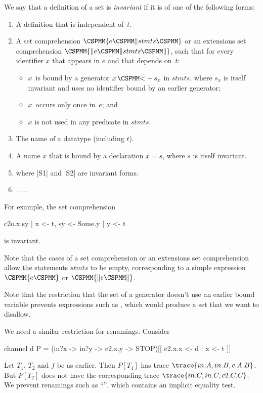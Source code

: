 \begin{definition}
\label{def:invariant}
We say that a definition of a set is \emph{invariant} if it is of one of the
following forms:
%
\begin{enumerate}
\item A definition that is independent of~$t$.

\item A set comprehension $\M\{ e \M\| stmts \M\}$ or an extensions set
comprehension $\M{\{\|} e \M\| stmts \M{\|\}}$, such that for every identifier
$x$ that appears in $e$ and that depends on~$t$:
  \begin{itemize}
  \item $x$~is bound by a generator $x \,\M{<-}\, s_x$ in $stmts$, where $s_x$ is
  itself invariant and uses no identifier bound by an earlier generator;
  \item $x$~occurs only once in~$e$; and
  \item $x$ is not used in any predicate in $stmts$.
  \end{itemize}

\item The name of a datatype (including $t$). 

\item A name $x$ that is bound by a declaration $x = s$, where $s$ is itself
invariant. 

\item {} where |S1| and |S2| are invariant forms. 

\item ......
\end{enumerate}
\end{definition}

For example, the set comprehension 
\begin{cspm}
{ c2o.x.sy | x <- t, sy <- {Some.y | y <- t} }
\end{cspm}
is invariant.

Note that the cases of a set comprehension or an extensions set comprehension
allow the statements $stmts$ to be empty, corresponding to a simple expression
$\M\{ e \M\}$ or $\M{\{\|} e \M{\|\}}$.

Note that the restriction that the set of a generator doesn't use an earlier
bound variable prevents expressions such as 
, which would produce a set that we
want to disallow.

We need a similar restriction for renamings.  Consider
%
\begin{cspm}
channel d
P = (in?x -> in?y -> c2.x.y -> STOP)[[ c2.x.x <- d | x <- t ]]
\end{cspm}
%
Let $T_1$, $T_2$ and $f$ be as earlier.  Then $P[T_1]$ has trace $\trace{in.A,
in.B, c.A.B}$.  But $P[T_2]$ does not have the corresponding trace
$\trace{in.C, in.C, c2.C.C}$.  We prevent renamings such as ``'', which contains an implicit equality test.




